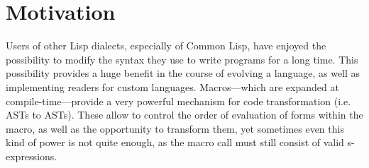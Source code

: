 \documentclass[a4paper,10pt,twoside]{report}
\newcommand{\el}{Emacs Lisp}
\newcommand{\cl}{Common Lisp}
\newcommand{\sym}[1]{\texttt{#1}}
\begin{document}






\chapter{Motivation}
\label{chapter:motivation}
Users of other Lisp dialects, especially of \cl{}, have enjoyed the possibility
to modify the syntax they use to write programs for a long time.  This
possibility provides a huge benefit in the course of evolving a language, as
well as implementing readers for custom languages.  Macros---which are expanded
at compile-time---provide a very powerful mechanism for code transformation
(i.e. ASTs to ASTs).  These allow to control the order of evaluation of forms
within the macro, as well as the opportunity to transform them, yet sometimes
even this kind of power is not quite enough, as the macro call must still
consist of valid s-expressions.
\end{document}
